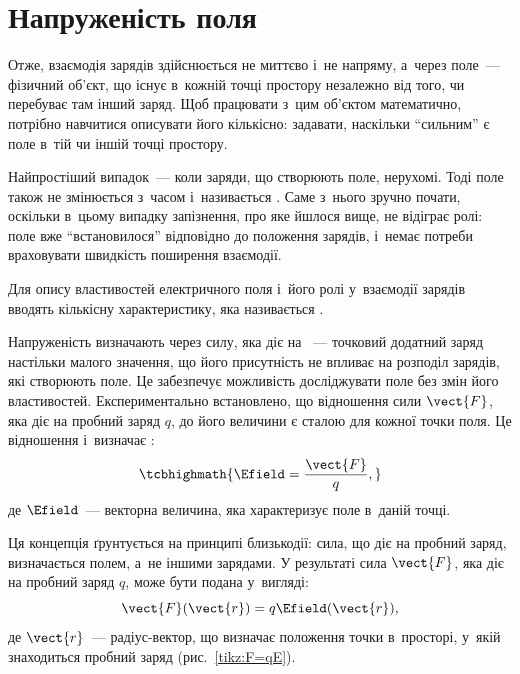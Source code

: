 \section{Напруженість поля}\hypertarget{field-strength}{}

Отже, взаємодія зарядів здійснюється не миттєво і~не напряму, а~через поле~--- фізичний
об'єкт, що існує в~кожній точці простору незалежно від того, чи перебуває там інший заряд.
Щоб працювати з~цим об'єктом математично, потрібно навчитися описувати його кількісно:
задавати, наскільки \enquote{сильним} є поле в~тій чи іншій точці простору.

Найпростіший випадок~--- коли заряди, що створюють поле, нерухомі. Тоді поле також не
змінюється з~часом і~називається . Саме з~нього зручно почати,
оскільки в~цьому випадку запізнення, про яке йшлося вище, не відіграє ролі: поле вже
\enquote{встановилося} відповідно до положення зарядів, і~немає потреби враховувати
швидкість поширення взаємодії.

Для опису властивостей електричного поля і~його ролі у~взаємодії зарядів вводять кількісну
характеристику, яка називається .

Напруженість визначають через силу, яка діє на ~--- точковий додатний
заряд настільки малого значення, що його присутність не впливає на розподіл зарядів, які
створюють поле. Це забезпечує можливість досліджувати поле без змін його властивостей.
Експериментально встановлено, що відношення сили $\vect{F}$, яка діє на пробний заряд $q$,
до його величини є сталою для кожної точки поля. Це відношення і~визначає
:
\begin{equation}\label{eq:E}
	\tcbhighmath{\Efield = \frac{\vect{F}}{q},}
\end{equation}
де $\Efield$~--- векторна величина, яка характеризує поле в~даній точці.

Ця концепція ґрунтується на принципі близькодії: сила, що діє на пробний заряд,
визначається полем, а~не іншими зарядами. У результаті сила $\vect{F}$, яка діє на пробний
заряд $q$, може бути подана у~вигляді:
\begin{equation}
	\vect{F}(\vect{r}) = q\Efield(\vect{r}),
\end{equation}
де $\vect{r}$~--- радіус-вектор, що визначає положення точки в~просторі, у~якій знаходиться
пробний заряд (рис.~\ref{tikz:F=qE}).

